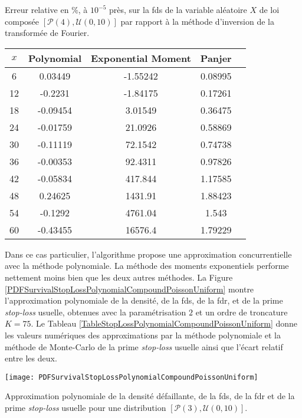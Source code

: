 	\begin{tableth}
		\caption[Erreur relative ($\%$) sur la \gls{fds} d'une loi $\left(\mathcal{P}(4),\mathcal{U}(0,10)\right)$]{Erreur relative en $\%$, à $10^{-5}$ près, sur la \gls{fds} de la variable aléatoire $X$ de loi composée $\left[\mathcal{P}(4),\mathcal{U}(0,10)\right]$ par rapport à la méthode d'inversion de la transformée de Fourier.}
			\label{TableRelativeErrorSurvivalDifferentMethodCompoundPoissonUniform}
		\begin{tabular}{|c||c|c|c|c|}
\hline
$x$ & Polynomial & Exponential Moment &Panjer \\
\hline
\hline
  6 & 0.03449 & -1.55242 & 0.08995 \\
 12 & -0.2231 & -1.84175 & 0.17261 \\
 18 & -0.09454 & 3.01549 & 0.36475 \\
 24 & -0.01759 & 21.0926 & 0.58869 \\
 30 & -0.11119 & 72.1542 & 0.74738 \\
 36 & -0.00353 & 92.4311 & 0.97826 \\
 42 & -0.05834 & 417.844 & 1.17585 \\
 48 & 0.24625 & 1431.91 & 1.88423 \\
 54 & -0.1292 & 4761.04 & 1.543 \\
 60 & -0.43455 & 16576.4 & 1.79229 \\
\hline
		\end{tabular}
	\end{tableth}
Dans ce cas particulier, l\rq{}algorithme propose une approximation concurrentielle avec la méthode polynomiale. La méthode des moments exponentiels performe nettement moins bien que les deux autres méthodes. La Figure \ref{PDFSurvivalStopLossPolynomialCompoundPoissonUniform} montre l\rq{}approximation polynomiale de la densité, de la \gls{fds}, de la \gls{fdr}, et de la prime \textit{stop-loss} usuelle, obtenues avec la paramétrisation $2$ et un ordre de troncature $K=75$. Le Tableau \ref{TableStopLossPolynomialCompoundPoissonUniform} donne les valeurs numériques des approximations par la méthode polynomiale et la méthode de Monte-Carlo de la prime \textit{stop-loss} usuelle ainsi que l\rq{}écart relatif entre les deux.\\
\begin{figureth}
\texttt{[image: PDFSurvivalStopLossPolynomialCompoundPoissonUniform]}
\caption{Approximation polynomiale de la densité défaillante, de la \gls{fds}, de la \gls{fdr} et de la prime \textit{stop-loss} usuelle pour une distribution $\left[\mathcal{P}(3),\mathcal{U}(0,10)\right]$.}		
\label{PDFSurvivalStopLossPolynomialCompoundPoissonUniform}
\end{figureth}

